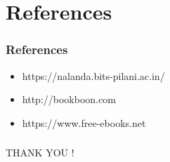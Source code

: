 \documentclass{beamer}
\begin{document}
\section{References}
\begin{frame}\frametitle{References}
\renewcommand{\bibname}{REFERENCES}
\nocite{*}
{

\begin{itemize}
    \item https://nalanda.bits-pilani.ac.in/
    \item http://bookboon.com
    \item https://www.free-ebooks.net
\end{itemize}
}
 
\end{frame}

\begin{frame}\frametitle{}
 \begin{block}{}
 	\begin{center} THANK YOU !
 	\end{center} 
\end{block}
\end{frame}
\end{document}
